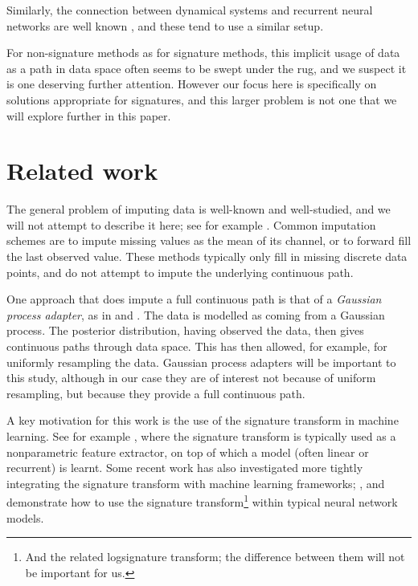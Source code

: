\documentclass{article}
\begin{document}
Similarly, the connection between dynamical systems and recurrent neural networks are well known \citep{TODO, TODO, TODO}, and these tend to use a similar setup.

For non-signature methods as for signature methods, this implicit usage of data as a path in data space often seems to be swept under the rug, and we suspect it is one deserving further attention. However our focus here is specifically on solutions appropriate for signatures, and this larger problem is not one that we will explore further in this paper.

\section{Related work}
The general problem of imputing data is well-known and well-studied, and we will not attempt to describe it here; see for example \citep[Chapter 25]{gelman2007dataanalysis}. Common imputation schemes are to impute missing values as the mean of its channel, or to forward fill the last observed value. These methods typically only fill in missing discrete data points, and do not attempt to impute the underlying continuous path.

One approach that does impute a full continuous path is that of a \emph{Gaussian process adapter}, as in \citep{li2016scalable} and \citep{futoma2017mgp}. The data is modelled as coming from a Gaussian process. The posterior distribution, having observed the data, then gives continuous paths through data space. This has then allowed, for example, for uniformly resampling the data. Gaussian process adapters will be important to this study, although in our case they are of interest not because of uniform resampling, but because they provide a full continuous path.


A key motivation for this work is the use of the signature transform in machine learning. See for example \citep{primer2016, yang2016rotation, kiraly2016kernels, li2017lpsnet, yang2017leveraging, chevyrev2018signature, toth2019gp, fermanian2019embedding, morrill2019sepsis}, where the signature transform is typically used as a nonparametric feature extractor, on top of which a model (often linear or recurrent) is learnt. Some recent work has also investigated more tightly integrating the signature transform with machine learning frameworks; \citet{jeremythesis}, \citet{logsigrnn} and \citet{kidger2019deep} demonstrate how to use the signature transform\footnote{And the related logsignature transform; the difference between them will not be important for us.} within typical neural network models.
\end{document}
